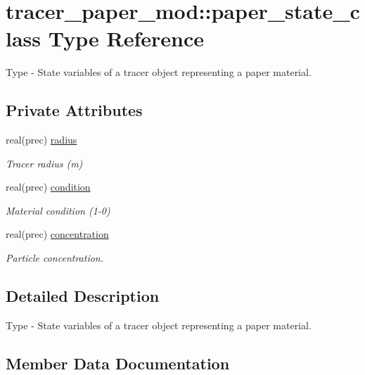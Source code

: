 \hypertarget{structtracer__paper__mod_1_1paper__state__class}{}\section{tracer\+\_\+paper\+\_\+mod\+:\+:paper\+\_\+state\+\_\+class Type Reference}
\label{structtracer__paper__mod_1_1paper__state__class}


Type -\/ State variables of a tracer object representing a paper material.  


\subsection*{Private Attributes}
\begin{DoxyCompactItemize}
\item 
real(prec) \hyperlink{structtracer__paper__mod_1_1paper__state__class_ac70463dad7537b4e18c6719e975a2a80}{radius}
\begin{DoxyCompactList}\small\item\em Tracer radius (m) \end{DoxyCompactList}\item 
real(prec) \hyperlink{structtracer__paper__mod_1_1paper__state__class_ad0c61709a67ed482b8f8dadb071c78a4}{condition}
\begin{DoxyCompactList}\small\item\em Material condition (1-\/0) \end{DoxyCompactList}\item 
real(prec) \hyperlink{structtracer__paper__mod_1_1paper__state__class_a6643de9258f8017d8ac1910f0b97541c}{concentration}
\begin{DoxyCompactList}\small\item\em Particle concentration. \end{DoxyCompactList}\end{DoxyCompactItemize}


\subsection{Detailed Description}
Type -\/ State variables of a tracer object representing a paper material. 

\subsection{Member Data Documentation}
\mbox{\label{structtracer__paper__mod_1_1paper__state__class_a6643de9258f8017d8ac1910f0b97541c}} 

